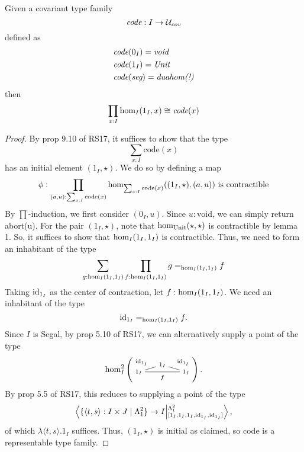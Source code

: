 \documentclass[main.tex]{subfiles}
\begin{document}
\begin{lemma}
    Given a covariant type family $$\emph{code} : I \to \mathcal{U_{\emph{cov}}}$$
    defined as
    \begin{align*}
        &\emph{code}(0_I) = \emph{void}\\
        &\emph{code}(1_I) = \emph{Unit}\\
        &\emph{code}(\emph{\seg}) = \emph{duahom(!)}
    \end{align*}
    then
    $$\prod_{x:I}\ho[I]{1_I}{x}\cong \emph{code}(x)$$
\end{lemma}
\begin{proof}
    By prop 9.10 of RS17, it suffices to show that the type  $$\sum_{x:I}\text{code}(x)$$ 
    has an initial element $(1_I, \star)$. We do so by defining a map
    $$\phi:\prod_{(a,u):\sum_{x:I}\text{code}(x)}\ho[\sum_{x:I}\text{code}(x)]{(1_I,\star)}{(a,u)} \text{ is contractible}$$
    By $\prod$-induction, we first consider $(0_I, u)$. Since $u : \text{void}$, we can simply return abort(u). For the pair $(1_I, \star)$, note that $\ho[\text{Unit}]{\star}{\star}$ is contractible by lemma 1. So, it suffices to show that $\ho[I]{1_I}{1_I}$ is contractible. Thus, we need to form an inhabitant of the type
    $$\sum_{g : \ho[I]{1_I}{1_I}}\prod_{f : \ho[I]{1_I}{1_I}} g=_{\ho[I]{1_I}{1_I}}f$$
    Taking $\id{1_I}$ as the center of contraction, let $f: \ho[I]{1_I}{1_I}$. We need an inhabitant of the type $$\id{1_I} =_{\ho[I]{1_I}{1_I}} f.$$
    Since $I$ is Segal, by prop 5.10 of RS17, we can alternatively supply a point of the type $$\homtwo{I}(1_I,1_I,1_I,\id{1_I},\id{1_I}, f).$$
    By prop 5.5 of RS17, this reduces to supplying a point of the type \[ \ndexten{\sh{\langle t,s \rangle:I \times J}{\Lambda^2_1}}{I}{\Lambda^2_1}{[1_I, 1_I, 1_I, \id{1_I}, \id{1_I}]}, \]
    of which $\lambda\langle t, s \rangle.1_I$ suffices. Thus, $(1_I, \star)$ is initial as claimed, so code is a representable type family.

\end{proof}
\end{document}
